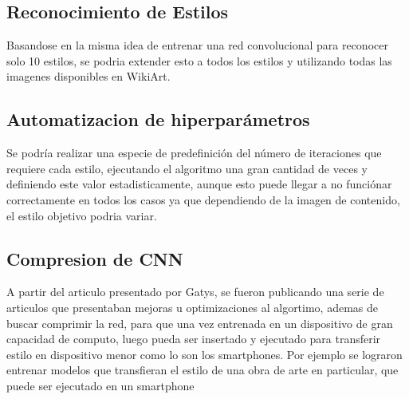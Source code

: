 \documentclass[a4paper,11pt,spanish]{book}
\begin{document}
    \subsection{Reconocimiento de Estilos}
      Basandose en la misma idea de entrenar una red convolucional para reconocer solo 10 estilos, se podria extender esto a todos los estilos y utilizando todas las imagenes disponibles
      en WikiArt.
    \subsection{Automatizacion de hiperparámetros}
      Se podría realizar una especie de predefinición del número de iteraciones que requiere cada estilo, ejecutando el algoritmo una gran cantidad de veces y definiendo este valor
      estadisticamente, aunque esto puede llegar a no funciónar correctamente en todos los casos ya que dependiendo de la imagen de contenido, el estilo objetivo podria variar.
    \subsection{Compresion de CNN}
      A partir del articulo presentado por Gatys, se fueron publicando una serie de articulos que presentaban mejoras u optimizaciones al algortimo, ademas de buscar comprimir la red,
      para que una vez entrenada en un dispositivo de gran capacidad de computo, luego pueda ser insertado y ejecutado para transferir estilo en dispositivo menor como lo son los smartphones.
      Por ejemplo se lograron entrenar modelos que transfieran el estilo de una obra de arte en particular, que puede ser ejecutado en un smartphone
      
\printindex

\end{document}
